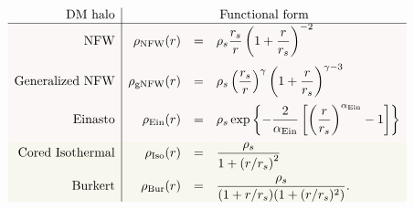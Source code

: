 \begin{table}[t]
$$\begin{array}{r|rcl}
\hbox{DM halo} & \multicolumn{3}{c}{\hbox{Functional form}}\\ \hline \rowcolor[rgb]{0.99,0.97,0.97}
{\rm NFW} & \rho_{\rm NFW}(r)  & = & \displaystyle \rho_{s}\frac{r_{s}}{r}\left(1+\frac{r}{r_{s}}\right)^{-2} \\[4mm] \rowcolor[rgb]{0.99,0.97,0.97}
{\rm Generalized \ NFW} &  \rho_{\rm gNFW}(r)  & = & \displaystyle \rho_{s} \left(\frac{r_s}{r}\right)^{\gamma} \left(1+\frac{r}{r_s}\right)^{\gamma-3} \\[4mm] \rowcolor[rgb]{0.99,0.97,0.97}
{\rm Einasto} & \rho_{\rm Ein}(r)  & = & \displaystyle \rho_{s}\exp\left\{-\frac{2}{\alpha_{\rm Ein}}\left[\left(\frac{r}{r_{s}}\right)^{\alpha_{\rm Ein}}-1\right]\right\} \\[4mm] \rowcolor[rgb]{0.97,0.97,0.93}
{\rm Cored} \ {\rm Isothermal} &  \rho_{\rm Iso}(r) & = & \displaystyle \frac{\rho_{s}}{1+\left(r/r_{s}\right)^{2}} \\[4mm] \rowcolor[rgb]{0.97,0.97,0.93}
{\rm Burkert} & \rho_{\rm Bur}(r) & = & \displaystyle  \frac{\rho_{s}}{(1+r/r_{s})(1+ (r/r_{s})^{2})}.
\end{array}
$$
\caption[DM density profiles]{\label{tab:rhoprofiles}\label{eq:profiles}
\em Plausible  spherical density profiles $\rho(r)$ for DM halos in galaxies.}
\end{table}

